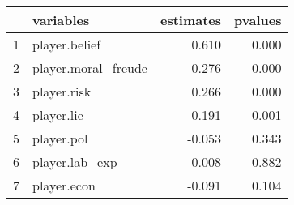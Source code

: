 \begin{table}[ht]
\centering
\begin{tabular}{rlrr}
  \hline
 & variables & estimates & pvalues \\ 
  \hline
1 & player.belief & 0.610 & 0.000 \\ 
  2 & player.moral\_freude & 0.276 & 0.000 \\ 
  3 & player.risk & 0.266 & 0.000 \\ 
  4 & player.lie & 0.191 & 0.001 \\ 
  5 & player.pol & -0.053 & 0.343 \\ 
  6 & player.lab\_exp & 0.008 & 0.882 \\ 
  7 & player.econ & -0.091 & 0.104 \\ 
   \hline
\end{tabular}
\end{table}
